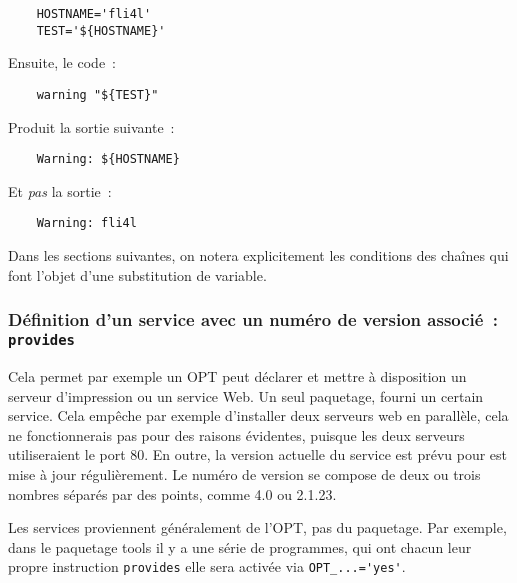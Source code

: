 \begin{example}
\begin{verbatim}
    HOSTNAME='fli4l'
    TEST='${HOSTNAME}'
\end{verbatim}
\end{example}

    Ensuite, le code~:

\begin{example}
\begin{verbatim}
    warning "${TEST}"
\end{verbatim}
\end{example}

    Produit la sortie suivante~:

\begin{example}
\begin{verbatim}
    Warning: ${HOSTNAME}
\end{verbatim}
\end{example}

    Et \emph{pas} la sortie~:

\begin{example}
\begin{verbatim}
    Warning: fli4l
\end{verbatim}
\end{example}

    Dans les sections suivantes, on notera explicitement les conditions des
	chaînes qui font l'objet d'une substitution de variable.


\subsubsection{Définition d'un service avec un numéro de version
    associé~: \texttt{provides}}

    Cela permet par exemple un OPT peut déclarer et mettre à disposition
	un serveur d'impression ou un service Web. Un seul paquetage, fourni un certain
	service. Cela empêche par exemple d'installer deux serveurs web en parallèle, cela
	ne fonctionnerais pas pour des raisons évidentes, puisque les deux serveurs utiliseraient
	le port 80. En outre, la version actuelle du service est prévu pour est mise à jour
	régulièrement. Le numéro de version se compose de deux ou trois nombres
	séparés par des points, comme \og{}4.0\fg{} ou \og{}2.1.23\fg{}.

    Les services proviennent généralement de l'OPT, pas du paquetage. Par exemple, dans
	le paquetage \og{}tools\fg{} il y a une série de programmes, qui ont chacun leur propre
	instruction \texttt{provides} elle sera activée via \verb+OPT_...='yes'+.


